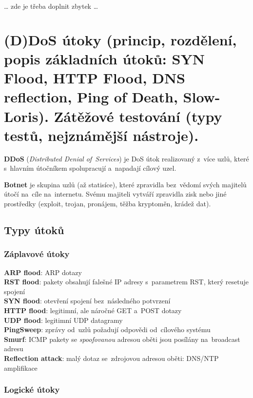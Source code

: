 
\begin{center}
{\huge \dots} zde je třeba doplnit zbytek {\huge \dots}
\end{center}

\clearpage
\section{(D)DoS útoky (princip, rozdělení, popis základních útoků: SYN Flood, HTTP Flood, DNS reflection, Ping of Death, Slow-Loris). Zátěžové testování (typy testů, nejznámější nástroje).}

\textbf{DDoS} (\emph{Distributed Denial of~Services}) je DoS útok realizovaný z~více uzlů, které s~hlavním útočníkem spolupracují a~napadají cílový uzel.

\textbf{Botnet} je skupina uzlů (až statisíce), které zpravidla bez~vědomí svých majitelů útočí na~cíle na~internetu. Svému majiteli vytváří zpravidla zisk nebo jiné prostředky (exploit, trojan, pronájem, těžba kryptoměn, krádež dat).

\subsection{Typy útoků}

\subsubsection{Záplavové útoky}

\textbf{ARP flood}: ARP dotazy \\
\textbf{RST flood}: pakety obsahují falešné IP adresy s~parametrem RST, který resetuje spojení \\
\textbf{SYN flood}: otevření spojení bez~následného potvrzení \\
\textbf{HTTP flood}: legitimní, ale náročné GET a~POST dotazy \\
\textbf{UDP flood}: legitimní UDP datagramy \\
\textbf{PingSweep}: zprávy od~uzlů požadují odpovědi od~cílového systému \\
\textbf{Smurf}: ICMP pakety se \emph{spoofovanou} adresou oběti jsou posílány na~broadcast adresu \\
\textbf{Reflection attack}: malý dotaz se~zdrojovou adresou oběti: DNS/NTP amplifikace

\subsubsection{Logické útoky}

